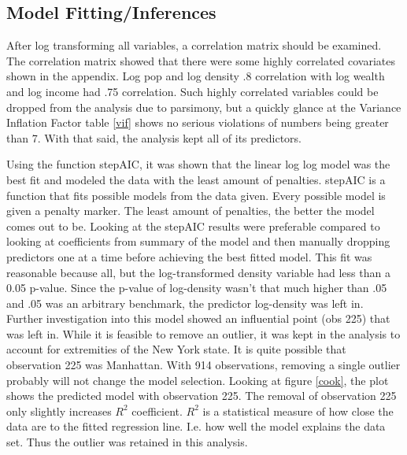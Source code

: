 \documentclass{article}\usepackage[]{graphicx}\usepackage[]{color}
\begin{document}
\subsection{Model Fitting/Inferences}
\qquad After log transforming all variables, a correlation matrix should be examined. The correlation matrix showed that there were some highly correlated covariates shown in the appendix. Log pop and log density .8 correlation with log wealth and log income had .75 correlation. Such highly correlated variables could be dropped from the analysis due to parsimony, but a quickly glance at the Variance Inflation Factor table \ref{vif} shows no serious violations of numbers being greater than 7. With that said, the analysis kept all of its predictors.  

\qquad Using the function stepAIC, it was shown that the linear log log model was the best fit and modeled the data with the least amount of penalties. stepAIC is a function that fits possible models from the data given. Every possible model is given a penalty marker. The least amount of penalties, the better the model comes out to be. Looking at the stepAIC results were preferable compared to looking at coefficients from summary of the model and then manually dropping predictors one at a time before achieving the best fitted model.  This fit was reasonable because all, but the log-transformed density variable had less than a 0.05 p-value. Since the p-value of log-density wasn't that much higher than .05 and .05 was an arbitrary benchmark, the predictor log-density was left in. Further investigation into this model showed an influential point (obs 225) that was left in. While it is feasible to remove an outlier, it was kept in the analysis to account for extremities of the New York state. It is quite possible that observation 225 was Manhattan. With 914 observations, removing a single outlier probably will not change the model selection. Looking at figure \ref{cook}, the plot shows the predicted model with observation 225. The removal of observation 225 only slightly increases $R^2$  coefficient. $R^2$ is a statistical measure of how close the data are to the fitted regression line. I.e. how well the model explains the data set. Thus the outlier was retained in this analysis.
\end{document}
